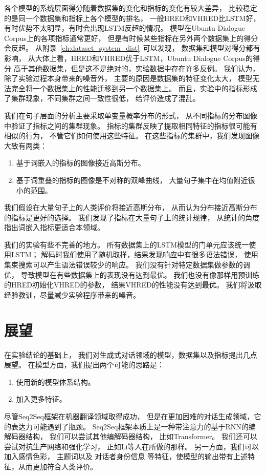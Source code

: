 各个模型的系统层面得分随着数据集的变化和指标的变化有较大差异，
比较稳定的是同一个数据集和指标上各个模型的排名，
一般HRED和VHRED比LSTM好，
有时优势不太明显，有时会出现LSTM反超的情况。
模型在Ubuntu Dialogue Corpus上的各项指标通常更好，
但是有时候某些指标在另外两个数据集上的得分会反超。
从附录~\ref{ch:dataset_system_dist}~可以发现，
数据集和模型对得分都有影响，
从大体上看，HRED和VHRED优于LSTM，Ubuntu Dialogue Corpus的得分
高于其他数据集，但是这不是绝对的，实验数据中存在许多反例。
我们认为，除了实验过程本身带来的噪音外，
主要的原因是数据集的特征变化太大，
模型无法完全将一个数据集上的性能迁移到另一个数据集上。
而且，实验中的指标形成了集群现象，不同集群之间一致性很低，
给评价造成了混乱。

我们在句子层面的分析主要采取单变量概率分布的形式，
从不同指标的分布图像中验证了指标之间的集群现象。
指标的集群反映了提取相同特征的指标很可能有相似的行为，
不管它们如何使用这些特征。
在这些指标的集群中，我们发现图像大致有两类：
\begin{enumerate}
    \item 基于词嵌入的指标的图像接近高斯分布。
    \item 基于词重叠的指标的图像是不对称的双峰曲线， 大量句子集中在均值附近很小的范围。
\end{enumerate}
我们假设在大量句子上的人类评价将接近高斯分布，
从而认为分布接近高斯分布的指标是更好的选择。
我们发现了指标在大量句子上的统计规律，
从统计的角度指出词嵌入指标更适合本领域。

我们的实验有些不完善的地方。
所有数据集上的LSTM模型的门单元应该统一使用LSTM；
解码时我们使用了随机取样，结果发现响应中有很多语法错误，
使用集束搜索可以产生语法错误较少的响应。
我们没有针对特定数据集做参数的调优，
导致模型在有些数据集上的表现没有达到最优。
我们也没有像那样用预训练的HRED初始化VHRED的参数，
结果VHRED的性能没有达到最优。
我们将汲取经验教训，尽量减少实验程序带来的噪音。

\section{展望}\label{sec:future_work}
在实验结论的基础上，
我们对生成式对话领域的模型，数据集以及指标提出几点展望。
在模型方面，我们提出两个可能的思路是：
\begin{enumerate}
    \item 使用新的模型体系结构。
    \item 加入更多特征。
\end{enumerate}

尽管Seq2Seq框架在机器翻译领域取得成功，
但是在更加困难的对话生成领域，它的表达力可能遇到了瓶颈。
Seq2Seq框架本质上是一种带注意力的基于RNN的编解码器结构，
我们可以尝试其他编解码器结构，
比如Transformer。
我们还可以尝试对抗生产网络和强化学习，
正如Li等人在所做的那样。
另一方面，我们可以加入感情色彩，
主题词以及
对话者身份信息
等特征，使模型的输出带有上述特征，从而更加符合人类评价。

